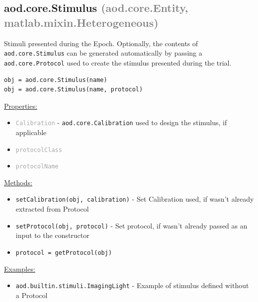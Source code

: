 \documentclass[10pt]{exam}
\newcommand\myparent[1]{\textcolor{gray}{(#1)}}
\newcommand\aodclass[1]{\textcolor{codeblue}{\texttt{#1}}}
\newcommand\aodprop[1]{\textcolor{darkgray}{\texttt{#1}}}
\newcommand\aodfcn[1]{\textcolor{darkteal}{\texttt{#1}}}
\newcommand\docheader[1]{\vspace{0.6ex}\noindent\underline{#1}\vspace{0.15ex}}
\begin{document}
	\subsection{aod.core.Stimulus \myparent{aod.core.Entity, matlab.mixin.Heterogeneous}}
		\noindent Stimuli presented during the Epoch. Optionally, the contents of \aodclass{aod.core.Stimulus} can be generated automatically by passing a \aodclass{aod.core.Protocol} used to create the stimulus presented during the trial.
		\begin{lstlisting}
obj = aod.core.Stimulus(name)
obj = aod.core.Stimulus(name, protocol)
		\end{lstlisting}
		\docheader{Properties:}
		\begin{itemize}
			\item \aodprop{Calibration} - \aodclass{aod.core.Calibration} used to design the stimulus, if applicable
			\item \aodprop{protocolClass}
			\item \aodprop{protocolName}
		\end{itemize}
		\docheader{Methods:}
		\begin{itemize}
			\item \aodfcn{setCalibration(obj, calibration)} - Set Calibration used, if wasn't already extracted from Protocol
			\item \aodfcn{setProtocol(obj, protocol)} - Set protocol, if wasn't already passed as an input to the constructor
			\item \aodfcn{protocol = getProtocol(obj)}
		\end{itemize}
		\docheader{Examples:}
		\begin{itemize}
			\item \aodclass{aod.builtin.stimuli.ImagingLight} - Example of stimulus defined without a Protocol
		\end{itemize}
	
\end{document}
